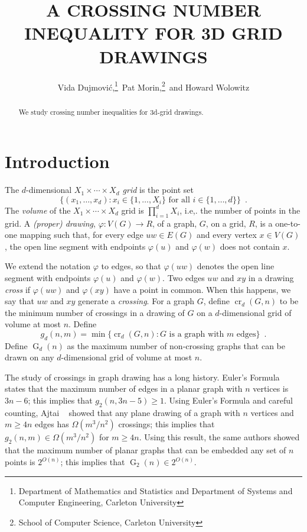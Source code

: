 \documentclass{patmorin}
\title{\MakeUppercase{A Crossing Number Inequality for 3D Grid Drawings}}
\author{Vida Dujmovi\'c,\thanks{Department of Mathematics and Statistics
and Department of Systems and Computer Engineering, Carleton University}\, Pat Morin,\thanks{School of Computer Science, Carleton University}\, and Howard Wolowitz}
\DeclareMathOperator{\crs}{cr}
\DeclareMathOperator{\ncs}{G}
\begin{document}
\maketitle

\begin{abstract}
   We study crossing number inequalities for 3d-grid drawings.
\end{abstract}

\section{Introduction}

The $d$-dimensional \emph{$X_1\times\cdots\times X_d$ grid} is the
point set 
\[  \{(x_1,\ldots,x_d): 
      \mbox{$x_i\in\{1,\ldots,X_i\}$ for all $i\in\{1,\ldots,d\}$}\}
	\enspace .\]
The \emph{volume} of the $X_1\times\cdots\times X_d$
grid is $\prod_{i=1}^d X_i$, i.e,. the number of points in the grid.
A \emph{(proper) drawing}, $\varphi:V(G)\rightarrow R$, of a graph, $G$,
on a grid, $R$, is a one-to-one mapping such that, for every edge $uw\in
E(G)$ and every vertex $x\in V(G)$, the open line segment with endpoints
$\varphi(u)$ and $\varphi(w)$ does not contain $x$.

We extend the notation $\varphi$ to edges, so that $\varphi(uw)$ denotes
the open line segment with endpoints $\varphi(u)$ and $\varphi(w)$.
Two edges $uw$ and $xy$ in a drawing \emph{cross} if $\varphi(uw)$
and $\varphi(xy)$ have a point in common.  When this happens, we
say that $uw$ and $xy$ generate a \emph{crossing}.  For a graph $G$,
define $\crs_d(G,n)$ to be the minimum number of crossings in a drawing
of $G$ on a $d$-dimensional grid of volume at most $n$.  Define
\[ g_d(n,m)=\min\{\crs_d(G,n):\text{$G$ is a graph with $m$ edges}\} \enspace .
\]
Define $\ncs_d(n)$ as the maximum number of non-crossing graphs that
can be drawn on any $d$-dimensional grid of volume at most $n$.

The study of crossings in graph drawing has a long history.  Euler's
Formula states that the maximum number of edges in a planar graph
with $n$ vertices is $3n-6$; this implies that $g_2(n,3n-5)\ge 1$.
Using Euler's Formula and careful counting, Ajtai \etal\ \cite{S}
showed that any plane drawing of a graph with $n$ vertices and
$m\ge 4n$ edges has $\Omega(m^3/n^2)$ crossings;  this implies that
$g_2(n,m)\in\Omega(m^3/n^2)$ for $m\ge 4n$.  Using this result, the
same authors showed that the maximum number of planar graphs that can
be embedded any set of $n$ points is $2^{O(n)}$;  this implies that
$\ncs_2(n)\in 2^{O(n)}$.
\end{document}
